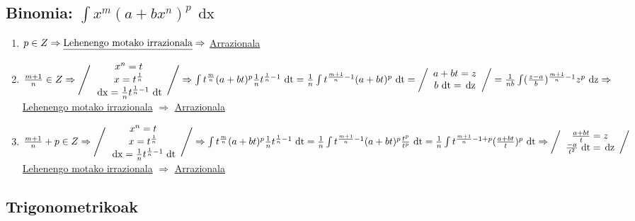 \documentclass[8pt]{article}
\DeclareMathOperator{\xder}{\, \mathrm{d}x}
\DeclareMathOperator{\tder}{\, \mathrm{d}t}
\DeclareMathOperator{\zder}{\, \mathrm{d}z}
\begin{document}
	\subsection{Binomia: $ \int x^m {(a + b x^n)}^{p} \xder $}
		\begin{enumerate}
			\item $ p \in Z \Rightarrow  
				\text{\underline{Lehenengo motako irrazionala}}
				 \Rightarrow $
				\underline{Arrazionala}
			\item $ \frac{m+1}{n} \in Z \Rightarrow 
				\left/
					\begin{array}{c}
						x^n = t\\
						x = t^{\frac{1}{n}}\\
						\xder = \frac{1}{n} t^{\frac{1}{n}-1} \tder
					\end{array}
				\right/ \Rightarrow
				\int t^{\frac{m}{n}} (a + bt)^p \frac{1}{n}
				t^{\frac{1}{n}-1} \tder = 
				\frac{1}{n} \int t^{\frac{m+1}{n}-1}
				(a + bt)^p \tder =
				\left/
					\begin{array}{c}
						a + bt = z\\
						b \tder = \zder
					\end{array} 
				\right/ = 
				\frac{1}{nb} \int (\frac{z-a}{b})^{\frac{m+1}{n}-1}
				z^p \zder \Rightarrow $
				\underline{Lehenengo motako irrazionala} 
				$ \Rightarrow $
				\underline{Arrazionala}
			\item $ \frac{m+1}{n} + p \in Z \Rightarrow
				\left/
					\begin{array}{c}
						x^n = t\\
						x = t^{\frac{1}{n}}\\
						\xder = \frac{1}{n} t^{\frac{1}{n}-1} \tder
					\end{array}
				\right/ \Rightarrow
				\int t^{\frac{m}{n}} (a + bt)^p \frac{1}{n}
				t^{\frac{1}{n}-1} \tder = \frac{1}{n}
				\int t^{\frac{m+1}{n}-1} (a + bt)^p
				\frac{t^p}{t^p} \tder = \frac{1}{n}
				\int t^{\frac{m+1}{n}-1+p}
				(\frac{a + bt}{t})^p \tder \Rightarrow
				\left/
					\begin{array}{c}
						\frac{a + bt}{t} = z\\
						\frac{-a}{t^2} \tder = \zder
					\end{array}
				\right/ $
				\underline{Lehenengo motako irrazionala}
				$ \Rightarrow $ \underline{Arrazionala}
		\end{enumerate}

	\subsection{Trigonometrikoak}
\end{document}
